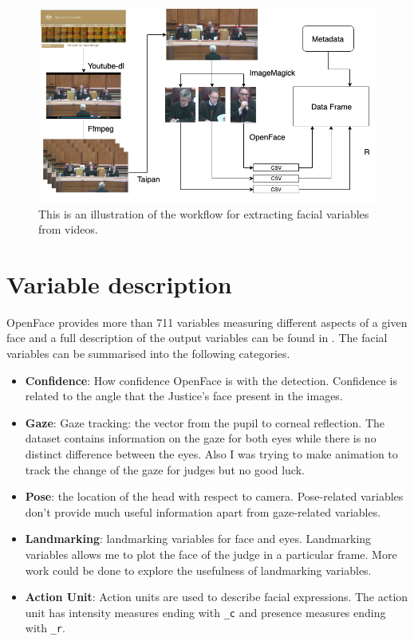 \documentclass{monashthesis}
\begin{document}
\begin{figure}

{\centering \includegraphics[width=1\linewidth]{figures/workflow} 

}

\caption{This is an illustration of the workflow for extracting facial variables from videos. \label{fig:workflow}}\label{fig:unnamed-chunk-1}
\end{figure}

\hypertarget{variable-description}{%
\section{Variable description}\label{variable-description}}

OpenFace provides more than 711 variables measuring different aspects of a given face and a full description of the output variables can be found in \textcite{baltrusaitis2018openface}. The facial variables can be summarised into the following categories.

\begin{itemize}
\item
  \textbf{Confidence}: How confidence OpenFace is with the detection. Confidence is related to the angle that the Justice's face present in the images.
\item
  \textbf{Gaze}: Gaze tracking: the vector from the pupil to corneal reflection. The dataset contains information on the gaze for both eyes while there is no distinct difference between the eyes. Also I was trying to make animation to track the change of the gaze for judges but no good luck.
\item
  \textbf{Pose}: the location of the head with respect to camera. Pose-related variables don't provide much useful information apart from gaze-related variables.
\item
  \textbf{Landmarking}: landmarking variables for face and eyes. Landmarking variables allows me to plot the face of the judge in a particular frame. More work could be done to explore the usefulness of landmarking variables.
\item
  \textbf{Action Unit}: Action units are used to describe facial expressions. The action unit has intensity measures ending with \texttt{\_c} and presence measures ending with \texttt{\_r}.
\end{itemize}
\end{document}
